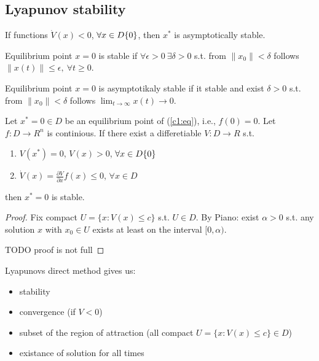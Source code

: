 \subsection{Lyapunov stability}

If functions $\dot V(x) < 0$, $\forall x \in D\\ \{0\}$, then $x^*$ is
asymptotically stable.

\begin{Definition}
Equilibrium point $x=0$ is stable if $\forall \epsilon > 0\ \exists \delta > 0$
s.t. from $\|x_0\| < \delta$ follows $\|x(t)\| \le \epsilon, \ \forall t \ge 0$.
\end{Definition}

\begin{Definition}
Equilibrium point $x=0$ is asymptotikaly stable if it stable and exist $\delta>0$
s.t. from $\|x_0\|<\delta$ follows 
$\lim_{t\rightarrow \infty}x(t) \rightarrow 0$.
\end{Definition}


\begin{Theorem}
Let $x^*=0 \in D$ be an equilibrium point of (\ref{c1:eq}), i.e., $f(0)=0.$ Let
$f: D \rightarrow R^n$ is continious. If there exist a differetiable 
$V:D\rightarrow R$ s.t. 
\begin{enumerate}
\item $V(x^*)=0$, $V(x)>0$, $\forall x \in D\\ \{0\}$
\item $\dot V(x) = \frac{\partial V}{\partial x}f(x) \le 0$, $\forall x \in D$
\end{enumerate}

then $x^*=0$ is stable.

\begin{proof}
 Fix compact $U=\{x:V(x)\le c\}$ s.t. $U\in D$. By Piano: exist $\alpha > 0$
s.t. any solution $x$ with $x_0 \in U$ exists at least on the interval
$[0,\alpha)$.

TODO proof is not full
\end{proof}
\end{Theorem}

Lyapunovs direct method gives us:
\begin{itemize}
 \item stability
 \item convergence (if $V<0$)
 \item subset of the region of attraction (all compact $U=\{x:V(x)\le c\} \in D$)
 \item existance of solution for all times
\end{itemize}





 

